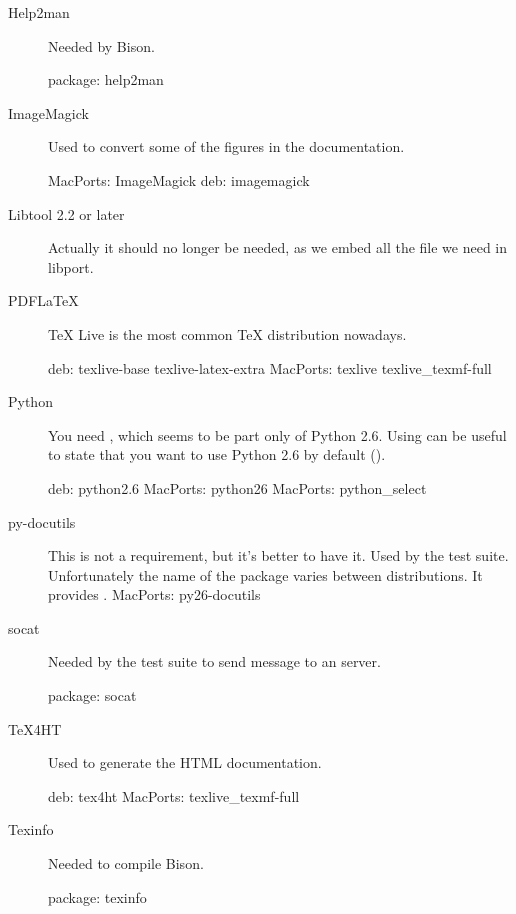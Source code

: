 \begin{description}
\item[Help2man]
Needed by Bison.
\begin{package}
package: help2man
\end{package}

\item[ImageMagick] Used to convert some of the figures in the
  documentation.
\begin{package}
MacPorts: ImageMagick
deb: imagemagick
\end{package}

\item[Libtool 2.2 or later] Actually it should no longer be needed, as
  we embed all the file we need in libport.

\item[PDFLaTeX] TeX Live is the most common \TeX{} distribution nowadays.
\begin{package}
deb: texlive-base texlive-latex-extra
MacPorts: texlive texlive_texmf-full
\end{package}

\item[Python] You need , which seems to be part only of
  Python 2.6.  Using  can be useful to state
  that you want to use Python 2.6 by default ().
\begin{package}
deb: python2.6
MacPorts: python26
MacPorts: python_select
\end{package}

\item[py-docutils] This is not a requirement, but it's better to have
  it.  Used by the test suite.  Unfortunately the name of the package
  varies between distributions.  It provides .  MacPorts:
  py26-docutils

\item[socat] Needed by the test suite to send message to an \urbi
  server.
\begin{package}
package: socat
\end{package}

\item[TeX4HT] Used to generate the HTML documentation.
\begin{package}
deb: tex4ht
MacPorts: texlive_texmf-full
\end{package}

\item[Texinfo] Needed to compile Bison.
\begin{package}
package: texinfo
\end{package}


\end{description}
